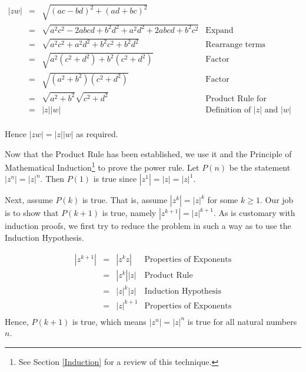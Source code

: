 \documentclass{ximera}
\begin{document}
\[ \begin{array}{rcll}

|zw| & = & \sqrt{(ac-bd)^2+(ad+bc)^2} & \\[3pt]
		 & = & \sqrt{a^2c^2 - 2abcd + b^2d^2 + a^2d^2 +2abcd + b^2c^2} & \text{Expand} \\ [3pt]
		 & = & \sqrt{a^2c^2 + a^2d^2 + b^2c^2 + b^2d^2} & \text{Rearrange terms} \\[3pt]
		 & = & \sqrt{a^2\left(c^2+d^2\right) + b^2\left(c^2+d^2\right)} & \text{Factor} \\[3pt]
		 & = & \sqrt{\left(a^2+b^2\right)\left(c^2+d^2\right)} & \text{Factor}\\[3pt]
		 & = & \sqrt{a^2+b^2} \sqrt{c^2+d^2} & \text{Product Rule for Radicals} \\[3pt]
		 & = & |z| |w| & \text{Definition of $|z|$ and $|w|$} \\ \end{array} \]
		 
Hence $|zw| = |z| |w|$ as required.  

\smallskip

Now that the Product Rule has been established, we use it and the Principle of Mathematical Induction\footnote{See Section \ref{Induction} for a review of this technique.} to 	prove the power rule.  Let $P(n)$ be the statement $\left|z^{n}\right| = |z|^n$.  Then $P(1)$ is true since $\left|z^{1}\right| = |z| = |z|^1$. 
  
  \smallskip
  
 Next, assume $P(k)$ is true.  That is, assume $\left|z^{k}\right| = |z|^k$ for some $k \geq 1$.    Our job is to show that $P(k+1)$ is true, namely $\left|z^{k+1}\right| = |z|^{k+1}$.  As is customary with induction proofs, we first try to reduce the problem in such a way as to  use the Induction Hypothesis.

\[\begin{array}{rcll}
\left|z^{k+1}\right| & = & \left|z^{k} z\right| & \text{Properties of Exponents} \\[3pt]
										 & = & \left|z^{k}\right| |z| & \text{Product Rule} \\[3pt]
										 & = &  |z|^{k} |z| & \text{Induction Hypothesis} \\[3pt]
										 & = &  |z|^{k+1} & \text{Properties of Exponents} \\ \end{array} \]
Hence, $P(k+1)$ is true, which means $\left|z^{n}\right| = |z|^{n}$ is true for all natural numbers $n$.  
\end{document}
